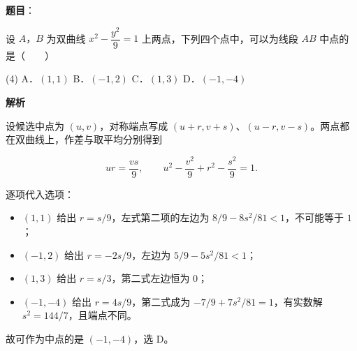 \begin{answer}

\textbf{题目}：

设 $A\text{，}B$ 为双曲线 $x^2-\dfrac{y^2}{9}=1$ 上两点，下列四个点中，可以为线段 $AB$ 中点的是\mbox{（　　）}

\begin{gkopts}(4)
\task A．$(1,1)$
\task B．$(-1,2)$
\task C．$(1,3)$
\task D．$(-1,-4)$
\end{gkopts}

\textbf{解析}

设候选中点为 $(u,v)$，对称端点写成 $(u+r,v+s)$、$(u-r,v-s)$。两点都在双曲线上，作差与取平均分别得到

\nopagebreak[4]
\[
ur=\frac{vs}{9},\qquad u^2-\frac{v^2}{9}+r^2-\frac{s^2}{9}=1.
\]

逐项代入选项：

\begin{itemize}
\item $(1,1)$ 给出 $r=s/9$，左式第二项的左边为 $8/9-8s^2/81<1$，不可能等于 $1$；
\item $(-1,2)$ 给出 $r=-2s/9$，左边为 $5/9-5s^2/81<1$；
\item $(1,3)$ 给出 $r=s/3$，第二式左边恒为 $0$；
\item $(-1,-4)$ 给出 $r=4s/9$，第二式成为 $-7/9+7s^2/81=1$，有实数解 $s^2=144/7$，且端点不同。
\end{itemize}

故可作为中点的是 $(-1,-4)$，选 D。


\end{answer}
